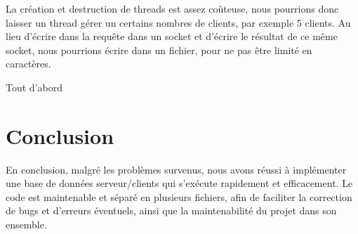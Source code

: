 \documentclass[utf8]{article}
\begin{document}
La création et destruction de threads est assez coûteuse, nous pourrions donc laisser un thread gérer un certains nombres de clients, par exemple 5 clients.
Au lieu d'écrire dans la requête dans un socket et d'écrire le résultat de ce même socket, nous pourrions écrire dans un fichier, pour ne pas être limité en caractères.

Tout d'abord
\section{Conclusion}
En conclusion, malgré les problèmes survenus, nous avons réussi à implémenter une base de données serveur/clients qui s'exécute rapidement et efficacement.\newline
Le code est maintenable et séparé en plusieurs fichiers, afin de faciliter la correction de bugs et d'erreurs éventuels, ainsi que la maintenabilité du projet dans son ensemble.
\end{document}
